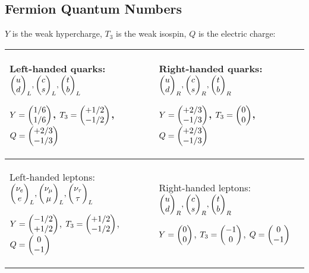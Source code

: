 	\subsection{Fermion Quantum Numbers}
		\label{Sec:FermionConstants}
		$Y$ is the weak hypercharge, $T_3$ is the weak isospin, $Q$ is the electric charge:
		\begin{center}
			\begin{tabular}{| L{.45\textwidth} | L{.45\textwidth} |}
				\hline
				Left-handed quarks: $\doublet{u}{d}_L, \doublet{c}{s}_L, \doublet{t}{b}_L$

				$Y=\doublet{1/6}{1/6}$, $T_3=\doublet{+1/2}{-1/2}$, $Q=\doublet{+2/3}{-1/3}$
				&
				Right-handed quarks: $\doublet{u}{d}_R, \doublet{c}{s}_R, \doublet{t}{b}_R$

				$Y=\doublet{+2/3}{-1/3}$, $T_3=\doublet{0}{0}$, $Q=\doublet{+2/3}{-1/3}$
				\\ 
				\hline
				Left-handed leptons: $\doublet{\nu_e}{e}_L, \doublet{\nu_\mu}{\mu}_L, \doublet{\nu_\tau}{\tau}_L$

				$Y=\doublet{-1/2}{+1/2}$, $T_3=\doublet{+1/2}{-1/2}$, $Q=\doublet{0}{-1}$
				&
				Right-handed leptons: $\doublet{u}{d}_R, \doublet{c}{s}_R, \doublet{t}{b}_R$

				$Y=\doublet{0}{0}$, $T_3=\doublet{-1}{0}$, $Q=\doublet{0}{-1}$
				\\ 
			\hline				
			\end{tabular}
		\end{center}

	\renewcommand{\arraystretch}{2.0}
